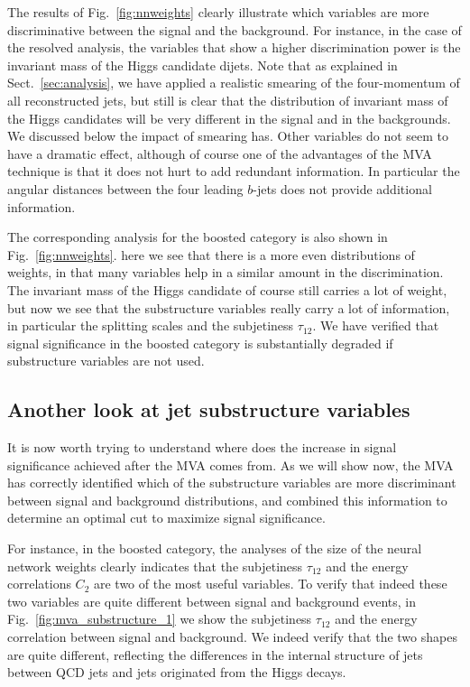The results of Fig.~\ref{fig:nnweights} clearly illustrate which variables
are more discriminative between the signal and the background.
%
For instance, in the case of the resolved analysis, the variables that show
a higher discrimination power is the invariant mass of the Higgs candidate dijets.
%
Note that as explained in Sect.~\ref{sec:analysis}, we have applied a realistic
smearing of the four-momentum of all reconstructed jets, but still is clear that the
distribution of invariant mass of the Higgs candidates will be very different
in the signal and in the backgrounds.
%
We discussed below the impact of smearing has.
%
Other variables do not seem to have a dramatic effect, although of course one of the
advantages of the MVA technique is that it does not hurt to add redundant
information.
%
In particular the angular distances between the four leading $b$-jets does not
provide additional information.


The corresponding analysis for the boosted category is also
shown in Fig.~\ref{fig:nnweights}.
%
here we see that there is a more even distributions of weights, in that many
variables help in a similar amount in the discrimination.
%
The invariant mass of the Higgs candidate of course still carries a lot of weight,
but now we see that the substructure variables really carry  a lot of information,
in particular the splitting scales and the subjetiness $\tau_{12}$.
%
We have verified that signal significance in the boosted category is substantially
degraded if substructure variables are not used.




\subsection{Another look at jet substructure variables}

It is now worth trying to understand where does the increase in signal significance
achieved after the MVA comes from.
%
As we will show now, the MVA has correctly identified which of the substructure
variables are more discriminant between signal and background distributions,
and combined this information to determine an optimal cut to maximize signal
significance.

For instance, in the boosted category, the analyses of the
size of the neural network weights clearly indicates that the subjetiness
$\tau_{12}$ and the energy correlations $C_2$ are two of the most useful
variables.
%
To verify that indeed these two variables are quite different between signal
and background events, in Fig.~\ref{fig:mva_substructure_1}
we show the subjetiness $\tau_{12}$ and the energy correlation between
signal and background.
%
We indeed verify that the two shapes are quite different,
reflecting the differences in the internal structure of jets
between QCD jets and jets originated from the Higgs decays.


